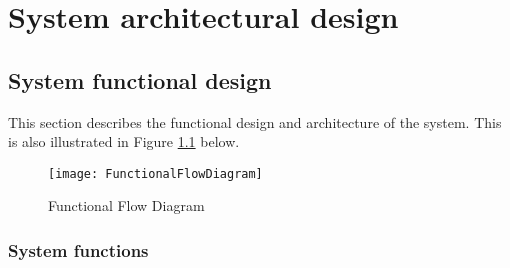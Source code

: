 \documentclass[Main]{subfiles}
\begin{document}
\chapter{System architectural design}
\section{System functional design}
This section describes the functional design and architecture of the system.
This is also illustrated in Figure \ref{fig:FFD} below.

\begin{figure}[H]
\centering
\texttt{[image: FunctionalFlowDiagram]}
\caption{Functional Flow Diagram}
\label{fig:FFD}
\end{figure}

\subsection{System functions}\label{sec:SysFunc}
\end{document}

